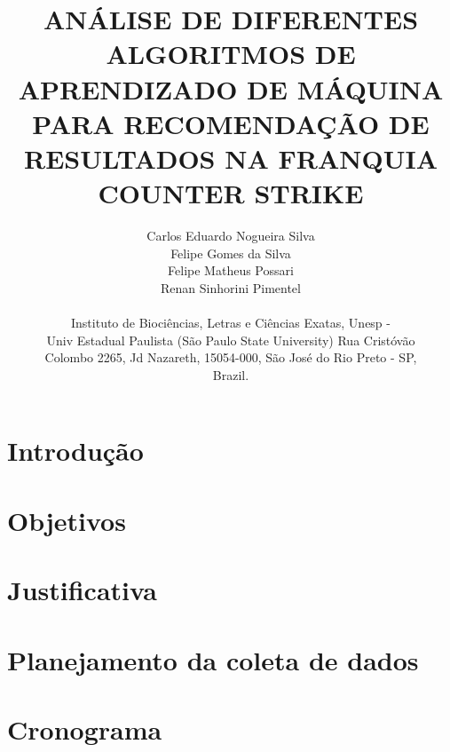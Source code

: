 \documentclass[a4paper,times,12pt]{article}
\begin{document}
\title{ANÁLISE DE DIFERENTES ALGORITMOS DE APRENDIZADO DE MÁQUINA PARA RECOMENDAÇÃO DE RESULTADOS NA FRANQUIA COUNTER STRIKE}
\author{Carlos Eduardo Nogueira Silva\\Felipe Gomes da Silva \\Felipe Matheus Possari\\Renan Sinhorini Pimentel\\ \\Instituto de Bioci\^{e}ncias, Letras e Ci\^{e}ncias Exatas, Unesp - \\ Univ Estadual Paulista (S\~{a}o Paulo State University) Rua Crist\'{o}v\~{a}o \\ Colombo 2265, Jd Nazareth, 15054-000, S\~{a}o Jos\'{e} do Rio Preto - SP, \\ Brazil.}
\maketitle

\section{Introdução}
\hspace{+15pt} 

\section{Objetivos}
\hspace{+15pt}

\section{Justificativa}
\hspace{+15pt}

\section{Planejamento da coleta de dados}
\hspace{+15pt}

\section{Cronograma}
\hspace{+15pt}
\end{document}
